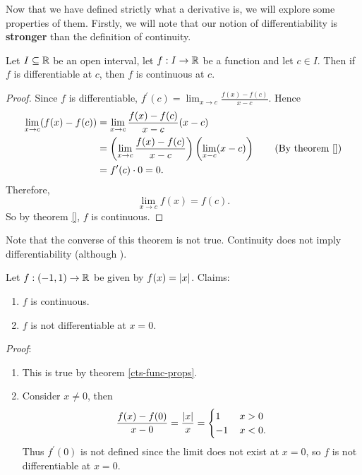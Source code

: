 \documentclass[../real_analysis.tex]{subfiles}
\begin{document}
        Now that we have defined strictly what a derivative is, we will explore some properties of them. Firstly, we will note that our notion of differentiability is \textbf{stronger} than the definition of continuity.
        \begin{theorem}\label{diff-cts}
            Let $I\subseteq\mathbb{R}$ be an open interval, let $f:I\to\mathbb{R}$ be a function and let $c\in I$. Then if $f$ is differentiable at $c$, then $f$ is continuous at $c$.
        \end{theorem}
        \begin{proof}
            Since $f$ is differentiable, $f^\prime(c)=\lim_{x\to c}\frac{f(x)-f(c)}{x-c}$. Hence
            \begin{align*}
                \lim_{x\to c}(f(x)-f(c))&=\lim_{x\to c}\frac{f(x)-f(c)}{x-c}(x-c)\\
                &=\left(\lim_{x\to c}\frac{f(x)-f(c)}{x-c}\right)\left(\lim_{x-c}(x-c)\right)\tag{By theorem \ref{}}\\ %
                &=f^\prime(c)\cdot0=0.
            \end{align*}
            Therefore,
            \begin{equation*}
                \lim_{x\to c}f(x)=f(c).
            \end{equation*}
            So by theorem \ref{}, $f$ is continuous. %
        \end{proof}
        Note that the converse of this theorem is not true. Continuity does not imply differentiability (although ).
        \begin{example}
            Let $f:(-1,1)\to\mathbb{R}$ be given by $f(x)=\lvert x\rvert$. Claims:
            \begin{enumerate}[\upshape(i)]
                \item $f$ is continuous.
                \item $f$ is not differentiable at $x=0$.
            \end{enumerate}
            \textit{Proof}:
            \begin{enumerate}[\upshape(i)]
                \item This is true by theorem \ref{cts-func-props}.
                \item Consider $x\neq 0$, then
                \begin{equation*}
                    \frac{f(x)-f(0)}{x-0}=\frac{\lvert x\rvert}{x}=\begin{cases}
                        1\,&x>0\\
                        -1\,&x<0.
                    \end{cases}
                \end{equation*}
                Thus $f^\prime(0)$ is not defined since the limit does not exist at $x=0$, so $f$ is not differentiable at $x=0$.
            \end{enumerate}
        \end{example}
\end{document}
